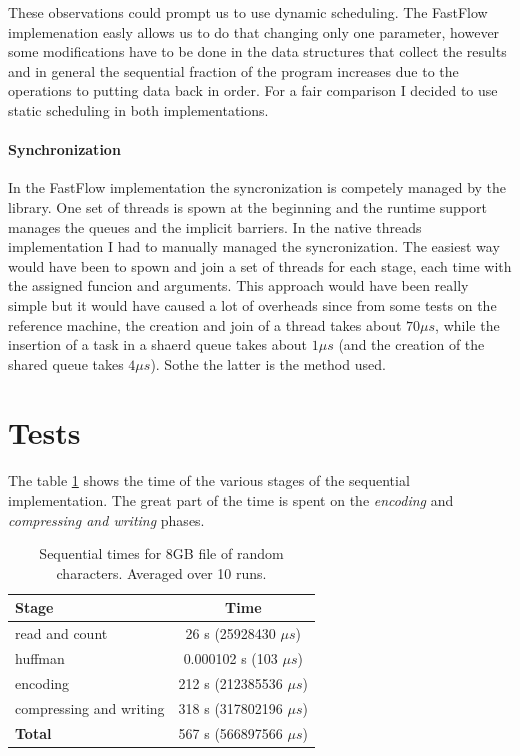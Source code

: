 \documentclass[12pt, letterpaper]{article}
\begin{document}
These observations could prompt us to use dynamic scheduling. The FastFlow implemenation easly allows us to do that changing only one parameter, however some modifications have to be done in the data structures that collect the results and in general the sequential fraction of the program increases due to the operations to putting data back in order. For a fair comparison I decided to use static scheduling in both implementations.

\paragraph*{Synchronization}
In the FastFlow implementation the syncronization is competely managed by the library. One set of threads is spown at the beginning and the runtime support manages the queues and the implicit barriers. In the native threads implementation I had to manually managed the syncronization. The easiest way would have been to spown and join a set of threads for each stage, each time with the assigned funcion and arguments. This approach would have been really simple but it would have caused a lot of overheads since from some tests on the reference machine, the creation and join of a thread takes about $70 \mu s$, while the insertion of a task in a shaerd queue takes about $1 \mu s$ (and the creation of the shared queue takes $4 \mu s$). Sothe the latter is the method used.




\section{Tests \label{sec:tests}}

The table \ref{tab:sequential_times} shows the time of the various stages of the sequential implementation. The great part of the time is spent on the \textit{encoding} and \textit{compressing and writing} phases.

\begin{table}[h]
\begin{center}
\begin{tabular}{l c}
    \textbf{Stage} & \textbf{Time}  \\
    \hline
    read and count & 26 s (25928430 $\mu s$) \\
    \hline
    huffman &  0.000102 s (103 $\mu s$) \\
    \hline
    encoding &  212 s  (212385536 $\mu s$) \\
    \hline
    compressing and writing & 318 s (317802196 $\mu s$) \\
    \hline
    \textbf{Total} & 567 s (566897566 $\mu s$) \\ 
\end{tabular}
\caption{Sequential times for 8GB file of random characters. Averaged over 10 runs.}
\label{tab:sequential_times}
\end{center}
\end{table}
\end{document}
